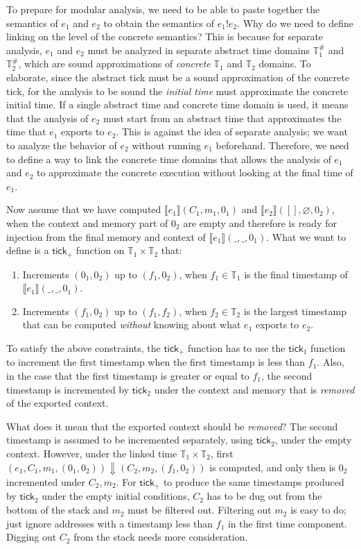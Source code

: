 \documentclass[acmsmall,review]{acmart}\settopmatter{printfolios=true,printccs=false,printacmref=false}
\theoremstyle{definition}
\newcommand*{\A}[1]{{#1}^{\#}}
\newcommand*{\Time}{\mathbb{T}}
\newcommand*{\ATime}{\A{\Time}}
\newcommand*{\mem}{m}
\newcommand*{\link}[2]{{#1}\mathtt{!}{#2}}
\newcommand*{\sembracket}[1]{\lBrack{#1}\rBrack}
\newcommand*{\tick}{\mathsf{tick}}
\begin{document}
To prepare for modular analysis, we need to be able to paste together the semantics of $e_1$ and $e_2$ to obtain the semantics of $\link{e_1}{e_2}$.
Why do we need to define linking on the level of the concrete semantics?
This is because for separate analysis, $e_1$ and $e_2$ must be analyzed in separate abstract time domains $\ATime_1$ and $\ATime_2$, which are sound approximations of \emph{concrete} $\Time_1$ and $\Time_2$ domains.
To elaborate, since the abstract tick must be a sound approximation of the concrete tick, for the analysis to be sound the \emph{initial time} must approximate the concrete initial time.
If a single abstract time and concrete time domain is used, it means that the analysis of $e_2$ must start from an abstract time that approximates the time that $e_1$ exports to $e_2$.
This is against the idea of separate analysis; we want to analyze the behavior of $e_2$ without running $e_1$ beforehand.
Therefore, we need to define a way to link the concrete time domains that allows the analysis of $e_1$ and $e_2$ to approximate the concrete execution without looking at the final time of $e_1$.

Now assume that we have computed $\sembracket{e_1}(C_1,\mem_1,0_1)$ and $\sembracket{e_2}([],\varnothing,0_2)$, when the context and memory part of $0_2$ are empty and therefore is ready for injection from the final memory and context of $\sembracket{e_1}(\_,\_,0_1)$.
What we want to define is a $\tick_+$ function on $\Time_1\times\Time_2$ that:
\begin{enumerate}
  \item Increments $(0_1,0_2)$ up to $(f_1,0_2)$, when $f_1\in\Time_1$ is the final timestamp of $\sembracket{e_1}(\_,\_,0_1)$.
  \item Increments $(f_1,0_2)$ up to $(f_1,f_2)$, when $f_2\in\Time_2$ is the largest timestamp that can be computed \emph{without} knowing about what $e_1$ exports to $e_2$.
\end{enumerate}

To satisfy the above constraints, the $\tick_+$ function has to use the $\tick_1$ function to increment the first timestamp when the first timestamp is less than $f_1$.
Also, in the case that the first timestamp is greater or equal to $f_1$, the second timestamp is incremented by $\tick_2$ under the context and memory that is \emph{removed} of the exported context.

What does it mean that the exported context should be \emph{removed}?
The second timestamp is assumed to be incremented separately, using $\tick_2$, under the empty context.
However, under the linked time $\Time_1\times\Time_2$, first $(e_1,C_1,\mem_1,(0_1,0_2))\Downarrow(C_2,\mem_2,(f_1,0_2))$ is computed, and only then is $0_2$ incremented under $C_2,\mem_2$.
For $\tick_+$ to produce the same timestamps produced by $\tick_2$ under the empty initial conditions, $C_2$ has to be dug out from the bottom of the stack and $\mem_2$ must be filtered out.
Filtering out $\mem_2$ is easy to do; just ignore addresses with a timestamp less than $f_1$ in the first time component.
Digging out $C_2$ from the stack needs more consideration.
\end{document}
